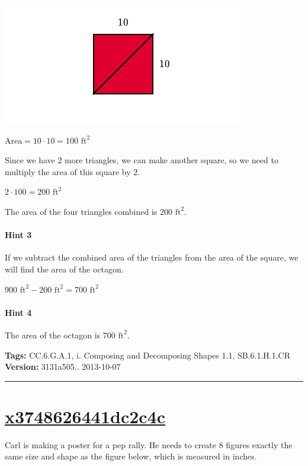 \documentclass[twocolumn,10pt]{article}
\def\shrinkfactor{0.55}
\begin{document}
\includegraphics[scale=\shrinkfactor]{figures/7b202092b90108ba9707f033da2930445cb57204.png}      

${\text{Area}}=10\cdot10=100\text{ ft}^2$  

Since we have $2$ more triangles, we can make another square, so we need to multiply the area of this square by $2$.  

$2\cdot100=200\text{ ft}^2$

The area of the four triangles combined is $200\text{ ft}^2$.

\paragraph{Hint 3}If we subtract the combined area of the triangles from the area of the square, we will find the area of the octagon.  

$900\text{ ft}^2-200\text{ ft}^2=700\text{ ft}^2$

\paragraph{Hint 4}The area of the octagon is $700\text{ ft}^2$.



\medskip
\noindent
\textbf{Tags:} {\footnotesize CC.6.G.A.1, i.	Composing and Decomposing Shapes 1.1, SB.6.1.H.1.CR}\\
\textbf{Version:} 3131a505.. 2013-10-07
\smallskip\hrule





\section{\href{https://www.khanacademy.org/devadmin/content/items/x3748626441dc2c4c}{x3748626441dc2c4c}}

\noindent
Carl is making a poster for a pep rally.  He needs to create $8$ figures exactly the same size and shape as the figure below, which is measured in inches.  
 
\end{document}
